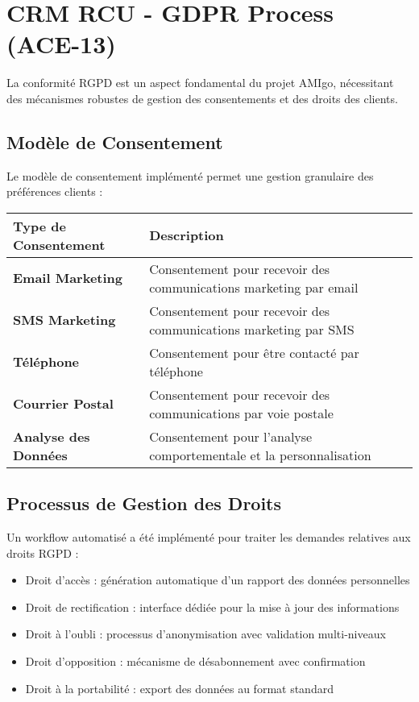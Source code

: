 \section{CRM RCU - GDPR Process (ACE-13)}

La conformité RGPD est un aspect fondamental du projet AMIgo, nécessitant des mécanismes robustes de gestion des consentements et des droits des clients.

\subsection{Modèle de Consentement}

Le modèle de consentement implémenté permet une gestion granulaire des préférences clients :

\begin{center}
\begin{tabular}{|>{\bfseries}p{4cm}|p{9.5cm}|}
\hline
\rowcolor{lightblue} Type de Consentement & Description \\
\hline
Email Marketing & Consentement pour recevoir des communications marketing par email \\
\hline
SMS Marketing & Consentement pour recevoir des communications marketing par SMS \\
\hline
Téléphone & Consentement pour être contacté par téléphone \\
\hline
Courrier Postal & Consentement pour recevoir des communications par voie postale \\
\hline
Analyse des Données & Consentement pour l'analyse comportementale et la personnalisation \\
\hline
\end{tabular}
\end{center}

\subsection{Processus de Gestion des Droits}

\begin{mdframed}[backgroundcolor=lightgreen!20, linewidth=1pt]
Un workflow automatisé a été implémenté pour traiter les demandes relatives aux droits RGPD :

\begin{itemize}
    \item Droit d'accès : génération automatique d'un rapport des données personnelles
    \item Droit de rectification : interface dédiée pour la mise à jour des informations
    \item Droit à l'oubli : processus d'anonymisation avec validation multi-niveaux
    \item Droit d'opposition : mécanisme de désabonnement avec confirmation
    \item Droit à la portabilité : export des données au format standard
\end{itemize}
\end{mdframed}

